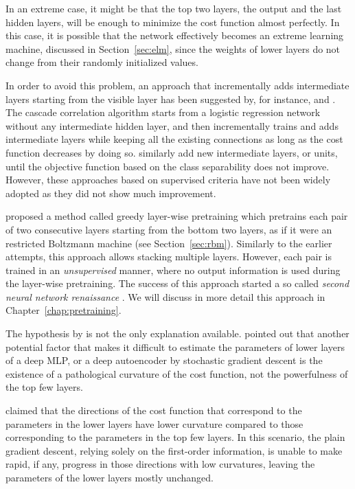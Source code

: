 \documentclass{now}
\begin{document}
In an extreme case, it might be that the top two layers, the
output and the last hidden layers, will be enough to minimize
the cost function almost perfectly. In this case, it is
possible that the network effectively becomes an extreme
learning machine, discussed in Section~\ref{sec:elm}, since
the weights of lower layers do not change from their
randomly initialized values. 

In order to avoid this problem, an approach that
incrementally adds intermediate layers starting from the
visible layer has been suggested by, for instance,
\citet{Fahlman1990} and \citet{Lengelle1996}.  The cascade
correlation algorithm \citep{Fahlman1990} starts from a
logistic regression network without any intermediate hidden
layer, and then incrementally trains and adds intermediate
layers while keeping all the existing connections as long as
the cost function decreases by doing so.
\citet{Lengelle1996} similarly add new intermediate layers,
or units, until the objective function based on the class
separability does not improve.  However, these approaches
based on supervised criteria have not been widely adopted as
they did not show much improvement.

\citet{Hinton2006} proposed a method called greedy
layer-wise pretraining which pretrains each pair of two
consecutive layers starting from the bottom two layers, as
if it were an restricted Boltzmann machine (see
Section~\ref{sec:rbm}). Similarly to the earlier attempts,
this approach allows stacking multiple layers. However, each
pair is trained in an \textit{unsupervised} manner, where
no output information is used during the layer-wise
pretraining. The success of this approach started a so
called \textit{second neural network renaissance}
\citep{Schmidhuber2011}.  We will discuss in more detail this
approach in Chapter~\ref{chap:pretraining}.

The hypothesis by \citet{Bengio2007nips} is not the only
explanation available.  \citet{Martens2010} pointed out that
another potential factor that makes it difficult to estimate the
parameters of lower layers of a deep MLP, or a deep autoencoder
by stochastic gradient descent is the existence of a pathological
curvature of the cost function, not the powerfulness of the top
few layers. 

\citet{Martens2010} claimed that the directions of the cost
function that correspond to the parameters in the lower
layers have lower curvature compared to those corresponding
to the parameters in the top few layers. In this scenario,
the plain gradient descent, relying solely on the first-order
information, is unable to make rapid, if any, progress in
those directions with low curvatures, leaving the parameters
of the lower layers mostly unchanged.
\end{document}
